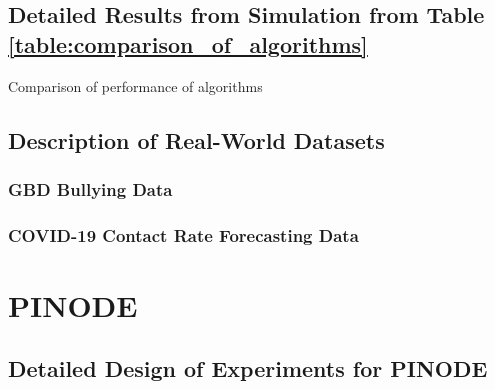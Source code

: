 \documentclass[12pt,a4paper]{book}
\numberwithin{equation}{section} %
\numberwithin{figure}{section} %
\numberwithin{table}{section} %
\begin{document}
\section{Detailed Results from Simulation from Table \ref{table:comparison_of_algorithms}}
\label{appendix:detailed_comparison}
\begin{table}[t]
    \centering
    \resizebox{\columnwidth}{!}{}
    \caption{Comparison of performance of algorithms}
    \label{table:detailed_comparison_of_algorithms}
\end{table}

\section{Description of Real-World Datasets}
\subsection{GBD Bullying Data}


\subsection{COVID-19 Contact Rate Forecasting Data}



\chapter{PINODE}
\section{Detailed Design of Experiments for PINODE}

\end{document}
